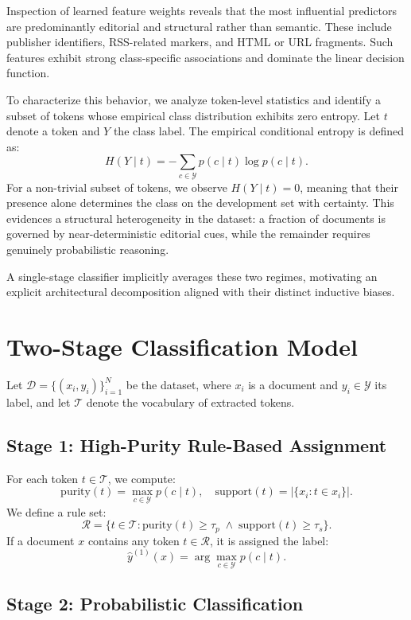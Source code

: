 Inspection of learned feature weights reveals that the most influential predictors are predominantly editorial and structural rather than semantic. These include publisher identifiers, RSS-related markers, and HTML or URL fragments. Such features exhibit strong class-specific associations and dominate the linear decision function.

To characterize this behavior, we analyze token-level statistics and identify a subset of tokens whose empirical class distribution exhibits zero entropy. Let $t$ denote a token and $Y$ the class label. The empirical conditional entropy is defined as:
\[
H(Y \mid t) = - \sum_{c \in \mathcal{Y}} p(c \mid t)\log p(c \mid t).
\]
For a non-trivial subset of tokens, we observe $H(Y \mid t)=0$, meaning that their presence alone determines the class on the development set with certainty. This evidences a structural heterogeneity in the dataset: a fraction of documents is governed by near-deterministic editorial cues, while the remainder requires genuinely probabilistic reasoning.

A single-stage classifier implicitly averages these two regimes, motivating an explicit architectural decomposition aligned with their distinct inductive biases.
\section{Two-Stage Classification Model}

Let $\mathcal{D}=\{(x_i,y_i)\}_{i=1}^N$ be the dataset, where $x_i$ is a document and $y_i\in\mathcal{Y}$ its label, and let $\mathcal{T}$ denote the vocabulary of extracted tokens.

\subsection{Stage 1: High-Purity Rule-Based Assignment}

For each token $t\in\mathcal{T}$, we compute:
\[
\text{purity}(t)=\max_{c\in\mathcal{Y}} p(c\mid t), \quad
\text{support}(t)=|\{x_i : t\in x_i\}|.
\]
We define a rule set:
\[
\mathcal{R}=\{t\in\mathcal{T} : \text{purity}(t)\ge\tau_p \;\wedge\; \text{support}(t)\ge\tau_s\}.
\]
If a document $x$ contains any token $t\in\mathcal{R}$, it is assigned the label:
\[
\hat{y}^{(1)}(x)=\arg\max_{c\in\mathcal{Y}} p(c\mid t).
\]

\subsection{Stage 2: Probabilistic Classification}

